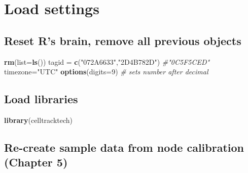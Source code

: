 \documentclass[
]{book}
\newenvironment{Shaded}{\begin{snugshade}}{\end{snugshade}}
\newcommand{\AttributeTok}[1]{\textcolor[rgb]{0.13,0.29,0.53}{#1}}
\newcommand{\CommentTok}[1]{\textcolor[rgb]{0.56,0.35,0.01}{\textit{#1}}}
\newcommand{\DecValTok}[1]{\textcolor[rgb]{0.00,0.00,0.81}{#1}}
\newcommand{\FunctionTok}[1]{\textcolor[rgb]{0.13,0.29,0.53}{\textbf{#1}}}
\newcommand{\NormalTok}[1]{#1}
\newcommand{\OtherTok}[1]{\textcolor[rgb]{0.56,0.35,0.01}{#1}}
\newcommand{\StringTok}[1]{\textcolor[rgb]{0.31,0.60,0.02}{#1}}
\begin{document}
\section{Load settings}\label{load-settings-4}

\subsection{Reset R's brain, remove all previous objects}\label{reset-rs-brain-remove-all-previous-objects}

\begin{Shaded}
\begin{Highlighting}[]
\FunctionTok{rm}\NormalTok{(}\AttributeTok{list=}\FunctionTok{ls}\NormalTok{())}
\NormalTok{tagid }\OtherTok{=} \FunctionTok{c}\NormalTok{(}\StringTok{"072A6633"}\NormalTok{,}\StringTok{"2D4B782D"}\NormalTok{) }\CommentTok{\#"0C5F5CED"}
\NormalTok{timezone}\OtherTok{=}\StringTok{"UTC"}
\FunctionTok{options}\NormalTok{(}\AttributeTok{digits=}\DecValTok{9}\NormalTok{) }\CommentTok{\# sets number after decimal}
\end{Highlighting}
\end{Shaded}

\subsection{Load libraries}\label{load-libraries-1}

\begin{Shaded}
\begin{Highlighting}[]
\FunctionTok{library}\NormalTok{(celltracktech)}
\end{Highlighting}
\end{Shaded}

\subsection{Re-create sample data from node calibration (Chapter 5)}\label{re-create-sample-data-from-node-calibration-chapter-5}
\end{document}
